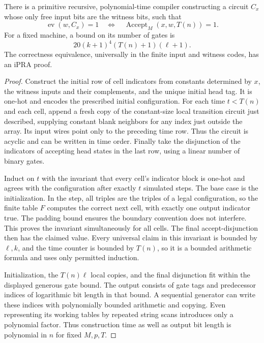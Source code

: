 \begin{theorem}\label{thm:verifier-circuit}
There is a primitive recursive, polynomial-time compiler constructing a
circuit $C_x$ whose only free input bits are the witness bits, such that
\[
 \operatorname{ev}(w,C_x)=1
       \quad\Longleftrightarrow\quad
 \operatorname{Accept}_M(x,w,T(n))=1.
\]
For a fixed machine, a bound on its number of gates is
\[
 20(k+1)^4(T(n)+1)(\ell+1).
\]
The correctness equivalence, universally in the finite input and witness
codes, has an iPRA proof.
\end{theorem}
\begin{proof}
Construct the initial row of cell indicators from constants determined
by $x$, the witness inputs and their complements, and the unique initial
head tag. It is one-hot and encodes the prescribed initial configuration.
For each time $t<T(n)$ and each cell, append a fresh copy of the constant-size
local transition circuit just described, supplying constant blank neighbors
for any index just outside the array. Its input wires point only to
the preceding time row. Thus the circuit is acyclic and can be written in
time order. Finally take the disjunction of the indicators of accepting
head states in the last row, using a linear number of binary gates.

Induct on $t$ with the invariant that every cell's indicator block is
one-hot and agrees with the configuration after exactly $t$ simulated
steps. The base case is the initialization. In the step, all triples are
the triples of a legal configuration, so the finite table $F$ computes
the correct next cell, with exactly one output indicator true. The padding
bound ensures the boundary convention does not interfere. This proves
the invariant simultaneously for all cells. The final accept-disjunction
then has the claimed value. Every universal claim in this invariant is
bounded by $\ell,k$, and the time counter is bounded by $T(n)$, so it is
a bounded arithmetic formula and uses only permitted induction.

Initialization, the $T(n)\ell$ local copies, and the final disjunction fit
within the displayed generous gate bound. The output consists of gate
tags and predecessor indices of logarithmic bit length in that bound.
A sequential generator can write these indices with polynomially bounded
arithmetic and copying. Even representing its working tables by repeated
string scans introduces only a polynomial factor. Thus construction time
as well as output bit length is polynomial in $n$ for fixed $M,p,T$.
\end{proof}

